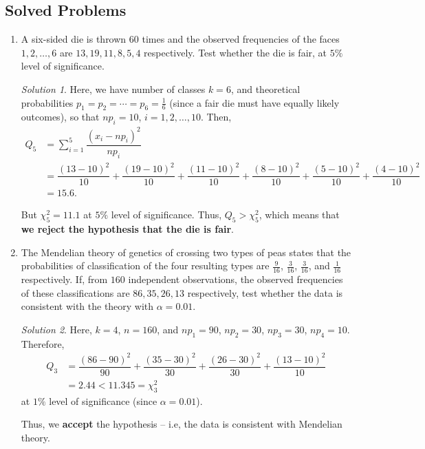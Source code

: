 \documentclass[svgnames, a5paper]{article}
\theoremstyle{definition}
\theoremstyle{remark}
\newtheorem*{Solution*}{Solution}
\begin{document}
\subsection{Solved Problems}\label{subsec:SolvedProblems2}
\begin{enumerate}
\item A six-sided die is thrown $60$ times and the observed frequencies of the faces $1, 2, \ldots, 6$ are $13, 19, 11, 8, 5, 4$ respectively. Test whether the die is fair, at $5\%$ level of significance.
\begin{Solution*}
Here, we have number of classes $k = 6$, and theoretical probabilities $p_1 = p_2 = \cdots = p_6 = \frac 1 6$ (since a fair die must have equally likely outcomes), so that $np_i = 10$, $i = 1, 2, \ldots, 10$. Then,
\begin{align*}
Q_5 & = \sum_{i = 1}^5 \dfrac{(x_i - np_i)^2}{np_i} \\
	& = \dfrac{(13- 10)^2}{10} + \dfrac{(19 - 10)^2}{10} + \dfrac{(11 - 10)^2}{10} + \dfrac{(8 - 10)^2}{10} + \dfrac{(5 - 10)^2}{10} + \dfrac{(4 - 10)^2}{10} \\
	& = 15.6.
\end{align*}

But $\chi^2_5 = 11.1$ at $5\%$ level of significance. Thus, $Q_5 > \chi^2_5$, which means that \textbf{we reject the hypothesis that the die is fair}.
\end{Solution*}

\item The Mendelian theory of genetics of crossing two types of peas states that the probabilities of classification of the four resulting types are $\frac 9 {16}$, $\frac 3 {16}$, $\frac 3 {16}$, and $\frac 1 {16}$ respectively. If, from $160$ independent observations, the observed frequencies of these classifications are $86, 35, 26, 13$ respectively, test whether the data is consistent with the theory with $\alpha = 0.01$.
\begin{Solution*}
Here, $k = 4$, $n = 160$, and $np_1 = 90$, $np_2 = 30$, $np_3 = 30$, $np_4 = 10$. Therefore,
\begin{align*}
Q_3 & = \dfrac{(86 - 90)^2}{90} + \dfrac{(35 - 30)^2}{30} + \dfrac{(26 - 30)^2}{30} + \dfrac{(13 - 10)^2}{10}\\
	& = 2.44 < 11.345 = \chi^2_3
\end{align*}
at $1\%$ level of significance (since $\alpha = 0.01$).

Thus, we \textbf{accept} the hypothesis -- i.e, the data is consistent with Mendelian theory.
\end{Solution*}
\end{enumerate}
\end{document}
